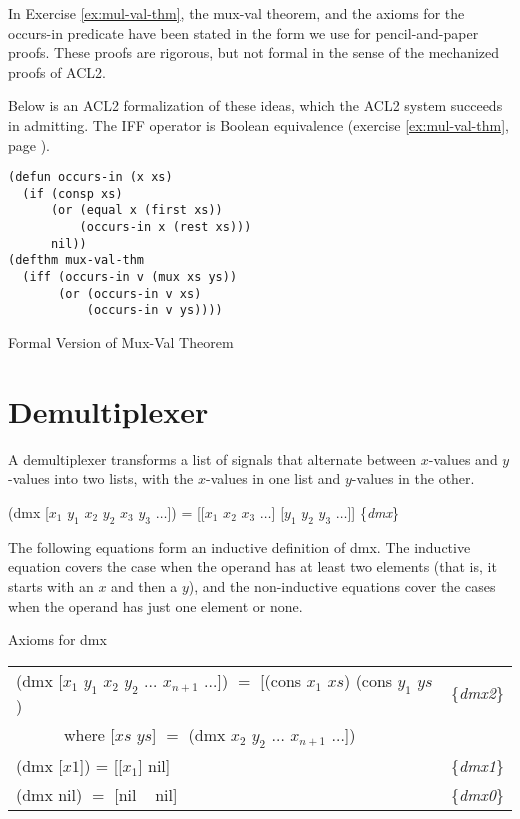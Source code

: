 \begin{aside}
In Exercise \ref{ex:mul-val-thm}, the mux-val theorem,
and the axioms for the occurs-in predicate
have been stated in the form we use for pencil-and-paper proofs.
These proofs are rigorous, but not formal
in the sense of the mechanized proofs of ACL2.

Below is an ACL2 formalization of these ideas,
which the ACL2 system succeeds in admitting.
\label{acl2:iff}
The IFF operator is Boolean equivalence
(exercise \ref{ex:mul-val-thm}, page \pageref{def:equivalence-op}).
\\

\label{defun:occurs-in}
\begin{Verbatim}
(defun occurs-in (x xs)
  (if (consp xs)
      (or (equal x (first xs))
          (occurs-in x (rest xs)))
      nil))
(defthm mux-val-thm
  (iff (occurs-in v (mux xs ys))
       (or (occurs-in v xs)
           (occurs-in v ys))))
\end{Verbatim}
\label{defthm:mux-val}

\caption{Formal Version of Mux-Val Theorem}
\label{aside:mux-val-thm}
\end{aside}


\section{Demultiplexer}
\label{sec:dmx}

A demultiplexer transforms a list of signals that alternate between
$x$-values and $y$-values into two lists,
with the $x$-values in one list and $y$-values in the other.

\hspace{1cm} (dmx [$x_1$ $y_1$ $x_2$ $y_2$ $x_3$ $y_3$ $\dots$]) =
[[$x_1$ $x_2$ $x_3$ $\dots$] [$y_1$ $y_2$ $y_3$ $\dots$]]
\hfill \{\emph{dmx}\}

The following equations form an inductive definition of dmx.
The inductive equation covers the case when
the operand has at least two elements
(that is, it starts with an $x$ and then a $y$),
and the non-inductive equations cover the cases
when the operand has just one element or none.
\begin{center}
Axioms for dmx
\begin{tabular}{ll}
(dmx [$x_1$ $y_1$ $x_2$ $y_2$ $\dots$ $x_{n+1}$ $\dots$]) $=$ [(cons $x_1$ $xs$) (cons $y_1$ $ys$) &\{\emph{dmx2}\} \\
~~~~~~where [$xs$ $ys$] $=$ (dmx $x_2$ $y_2$ $\dots$ $x_{n+1}$ $\dots$])                           &\\
(dmx [$x1$]) =  [[$x_1$] nil]                                                                      &\{\emph{dmx1}\} \\
(dmx nil) $=$ [nil ~ nil]                                                                          &\{\emph{dmx0}\} \\
\end{tabular}
\end{center}

